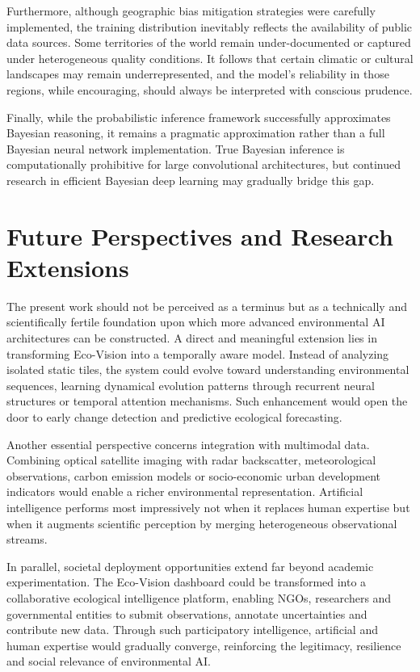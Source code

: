 \documentclass[12pt,a4paper]{report}
\begin{document}
Furthermore, although geographic bias mitigation strategies were carefully implemented, the training distribution inevitably reflects the availability of public data sources. Some territories of the world remain under-documented or captured under heterogeneous quality conditions. It follows that certain climatic or cultural landscapes may remain underrepresented, and the model's reliability in those regions, while encouraging, should always be interpreted with conscious prudence.

Finally, while the probabilistic inference framework successfully approximates Bayesian reasoning, it remains a pragmatic approximation rather than a full Bayesian neural network implementation. True Bayesian inference is computationally prohibitive for large convolutional architectures, but continued research in efficient Bayesian deep learning may gradually bridge this gap.

\section{Future Perspectives and Research Extensions}

The present work should not be perceived as a terminus but as a technically and scientifically fertile foundation upon which more advanced environmental AI architectures can be constructed. A direct and meaningful extension lies in transforming Eco-Vision into a temporally aware model. Instead of analyzing isolated static tiles, the system could evolve toward understanding environmental sequences, learning dynamical evolution patterns through recurrent neural structures or temporal attention mechanisms. Such enhancement would open the door to early change detection and predictive ecological forecasting.

Another essential perspective concerns integration with multimodal data. Combining optical satellite imaging with radar backscatter, meteorological observations, carbon emission models or socio-economic urban development indicators would enable a richer environmental representation. Artificial intelligence performs most impressively not when it replaces human expertise but when it augments scientific perception by merging heterogeneous observational streams.

In parallel, societal deployment opportunities extend far beyond academic experimentation. The Eco-Vision dashboard could be transformed into a collaborative ecological intelligence platform, enabling NGOs, researchers and governmental entities to submit observations, annotate uncertainties and contribute new data. Through such participatory intelligence, artificial and human expertise would gradually converge, reinforcing the legitimacy, resilience and social relevance of environmental AI.
\end{document}
